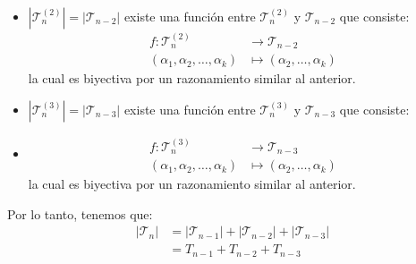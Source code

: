\begin{solucion}
\begin{itemize}
\begin{align*}
            (\alpha_1,\alpha_2,\ldots,\alpha_k) &\mapsto (\alpha_2,\ldots,\alpha_k)
        \end{align*}
        la cual es inyectiva pues si \(f(\alpha_1,\alpha_2,\ldots,\alpha_k)=f(\beta_1,\beta_2,\ldots,\beta_k)\) entonces \((\alpha_2,\ldots,\alpha_k)=(\beta_2,\ldots,\beta_k)\), luego \(\alpha_i =\beta_i\) para \(i=2,\ldots,k\) y \(\alpha_1=\beta_1=1\). Por lo tanto, \((\alpha_1,\alpha_2,\ldots,\alpha_k)=(\beta_1,\beta_2,\ldots,\beta_k)\), y es sobreyectiva pues para cualquier \((\alpha_2,\ldots,\alpha_k)\in \mathcal T_{n-1}\) existe $(\alpha_1,\alpha_2,\ldots,\alpha_k)\in \mathcal T_n^{(1)}$ tal que \(f(\alpha_1,\alpha_2,\ldots,\alpha_k)=(\alpha_2,\ldots,\alpha_k)\).
        \item $|\mathcal T_n^{(2)}| = |\mathcal T_{n-2}|$ existe una función entre \(\mathcal T_n^{(2)}\) y \(\mathcal T_{n-2}\) que consiste:
        \begin{align*}
            f: \mathcal T_n^{(2)} &\to \mathcal T_{n-2} \\
            (\alpha_1,\alpha_2,\ldots,\alpha_k) &\mapsto (\alpha_2,\ldots,\alpha_k)
        \end{align*}
        la cual es biyectiva por un razonamiento similar al anterior.
        \item $|\mathcal T_n^{(3)}| = |\mathcal T_{n-3}|$ existe una función entre \(\mathcal T_n^{(3)}\) y \(\mathcal T_{n-3}\) que consiste:
        \item \begin{align*}
            f: \mathcal T_n^{(3)} &\to \mathcal T_{n-3} \\
            (\alpha_1,\alpha_2,\ldots,\alpha_k) &\mapsto (\alpha_2,\ldots,\alpha_k)
        \end{align*}
        la cual es biyectiva por un razonamiento similar al anterior.
    \end{itemize}
    Por lo tanto, tenemos que:
    \begin{align*}
        |\mathcal T_n| &= |\mathcal T_{n-1}| + |\mathcal T_{n-2}| + |\mathcal T_{n-3}| \\
        &= T_{n-1} + T_{n-2} + T_{n-3}
    \end{align*}
\end{solucion}